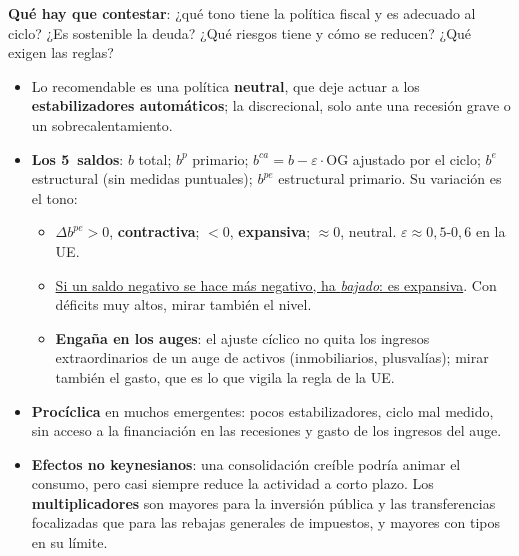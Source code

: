 \documentclass{article}
\begin{document}
\begin{columnas}
\begin{ideaclave}
\textbf{Qué hay que contestar}: ¿qué tono tiene la política fiscal y es adecuado al ciclo? ¿Es sostenible la deuda? ¿Qué riesgos tiene y cómo se reducen? ¿Qué exigen las reglas?
\end{ideaclave}
\begin{itemize}[itemsep=1.5pt]
\item Lo recomendable es una política \textbf{neutral}, que deje actuar a los \textbf{estabilizadores automáticos}; la discrecional, solo ante una recesión grave o un sobrecalentamiento.
\item \textbf{Los 5~saldos}: $b$ total; $b^p$ primario; $b^{ca}=b-\varepsilon\cdot\mathrm{OG}$ ajustado por el ciclo; $b^e$ estructural (sin medidas puntuales); $b^{pe}$ estructural primario. Su variación es el tono:
  \begin{itemize}
  \item $\Delta b^{pe}>0$, \textbf{contractiva}; $<0$, \textbf{expansiva}; $\approx0$, neutral. $\varepsilon\approx0{,}5$-$0{,}6$ en la UE.
  \item \uline{Si un saldo negativo se hace más negativo, ha \emph{bajado}: es expansiva}. Con déficits muy altos, mirar también el nivel.
  \item \textbf{Engaña en los auges}: el ajuste cíclico no quita los ingresos extraordinarios de un auge de activos (inmobiliarios, plusvalías); mirar también el gasto, que es lo que vigila la regla de la UE.
  \end{itemize}
\end{itemize}
\begin{itemize}[itemsep=1.5pt]
\item \textbf{Procíclica} en muchos emergentes: pocos estabilizadores, ciclo mal medido, sin acceso a la financiación en las recesiones y gasto de los ingresos del auge.
\item \textbf{Efectos no keynesianos}: una consolidación creíble podría animar el consumo, pero casi siempre reduce la actividad a corto plazo. Los \textbf{multiplicadores} son mayores para la inversión pública y las transferencias focalizadas que para las rebajas generales de impuestos, y mayores con tipos en su límite.

\end{itemize}
\end{columnas}
\end{document}
